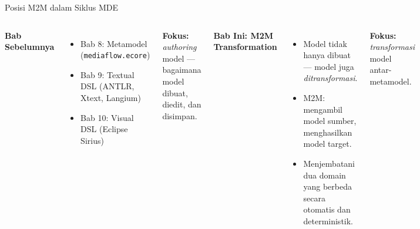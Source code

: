 \documentclass[aspectratio=169, table]{beamer}
\begin{document}
\begin{frame}{Posisi M2M dalam Siklus MDE}
\vspace{6pt}
\begin{columns}[T]
\textbf{Bab Sebelumnya}
\begin{itemize}
  \item Bab 8: Metamodel (\texttt{mediaflow.ecore})
  \item Bab 9: Textual DSL (ANTLR, Xtext, Langium)
  \item Bab 10: Visual DSL (Eclipse Sirius)
\end{itemize}

\vspace{6pt}
\textbf{Fokus:} \textit{authoring} model --- bagaimana model dibuat, diedit, dan disimpan.

\textbf{Bab Ini: M2M Transformation}
\begin{itemize}
  \item Model tidak hanya dibuat --- model juga \textit{ditransformasi}.
  \item M2M: mengambil model sumber, menghasilkan model target.
  \item Menjembatani dua domain yang berbeda secara otomatis dan deterministik.
\end{itemize}

\vspace{6pt}
\textbf{Fokus:} \textit{transformasi} model antar-metamodel.
\end{columns}
\end{frame}
\end{document}
